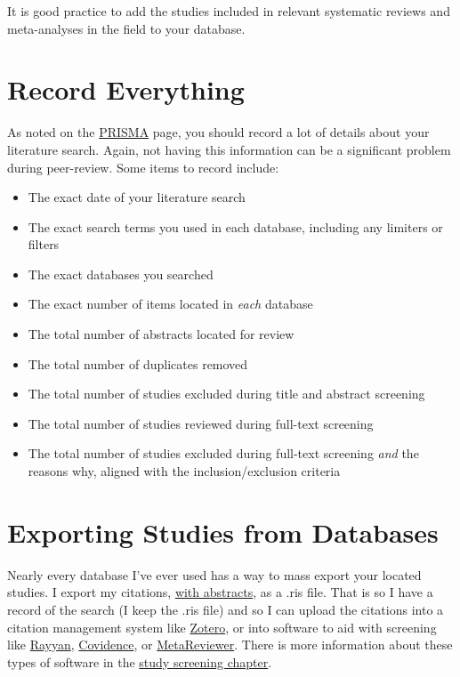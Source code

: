 \documentclass[
]{book}
\begin{document}
It is good practice to add the studies included in relevant systematic reviews and meta-analyses in the field to your database.

\hypertarget{record-everything}{%
\section{Record Everything}\label{record-everything}}

As noted on the \protect\hyperlink{crossPRISMA}{PRISMA} page, you should record a lot of details about your literature search. Again, not having this information can be a significant problem during peer-review. Some items to record include:

\begin{itemize}
\item
  The exact date of your literature search
\item
  The exact search terms you used in each database, including any limiters or filters
\item
  The exact databases you searched
\item
  The exact number of items located in \emph{each} database
\item
  The total number of abstracts located for review
\item
  The total number of duplicates removed
\item
  The total number of studies excluded during title and abstract screening
\item
  The total number of studies reviewed during full-text screening
\item
  The total number of studies excluded during full-text screening \emph{and} the reasons why, aligned with the inclusion/exclusion criteria
\end{itemize}

\hypertarget{exporting-studies-from-databases}{%
\section{Exporting Studies from Databases}\label{exporting-studies-from-databases}}

Nearly every database I've ever used has a way to mass export your located studies. I export my citations, \ul{with abstracts}, as a .ris file. That is so I have a record of the search (I keep the .ris file) and so I can upload the citations into a citation management system like \protect\hyperlink{0}{Zotero}, or into software to aid with screening like \protect\hyperlink{0}{Rayyan}, \protect\hyperlink{0}{Covidence}, or \protect\hyperlink{0}{MetaReviewer}. There is more information about these types of software in the \protect\hyperlink{0}{study screening chapter}.
\end{document}
